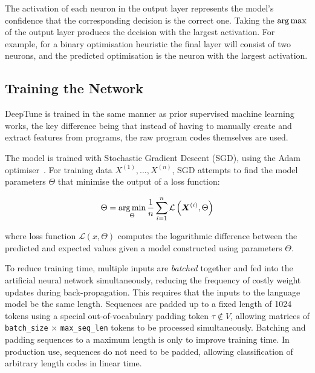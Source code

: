 The activation of each neuron in the output layer represents the model's confidence that the corresponding decision is the correct one. Taking the $\operatorname*{arg\,max}$ of the output layer produces the decision with the largest activation. For example, for a binary optimisation heuristic the final layer will consist of two neurons, and the predicted optimisation is the neuron with the largest activation.


\subsection{Training the Network}

DeepTune is trained in the same manner as prior supervised machine learning works, the key difference being that instead of having to manually create and extract features from programs, the raw program codes themselves are used.

The model is trained with Stochastic Gradient Descent (SGD), using the Adam optimiser~\cite{Kingma2015}. For training data $X^{(1)}, \ldots, X^{(n)}$, SGD attempts to find the model parameters $\Theta$ that minimise the output of a loss function:

\begin{equation}
\Theta = \operatorname*{arg\,min}_{\Theta} \frac{1}{n} \sum_{i=1}^{n} \mathcal{L} \left( \bm{X}^{(i)}, \Theta \right)
\end{equation}

where loss function $\mathcal{L} \left(x, \Theta \right)$ computes the logarithmic difference between the predicted and expected values given a model constructed using parameters $\Theta$.

To reduce training time, multiple inputs are \emph{batched} together and fed into the artificial neural network simultaneously, reducing the frequency of costly weight updates during back-propagation. This requires that the inputs to the language model be the same length. Sequences are padded up to a fixed length of 1024 tokens using a special out-of-vocabulary padding token $\tau \not\in V$, allowing matrices of \texttt{batch\_size} $\times$ \texttt{max\_seq\_len} tokens to be processed simultaneously. Batching and padding sequences to a maximum length is only to improve training time. In production use, sequences do not need to be padded, allowing classification of arbitrary length codes in linear time.
